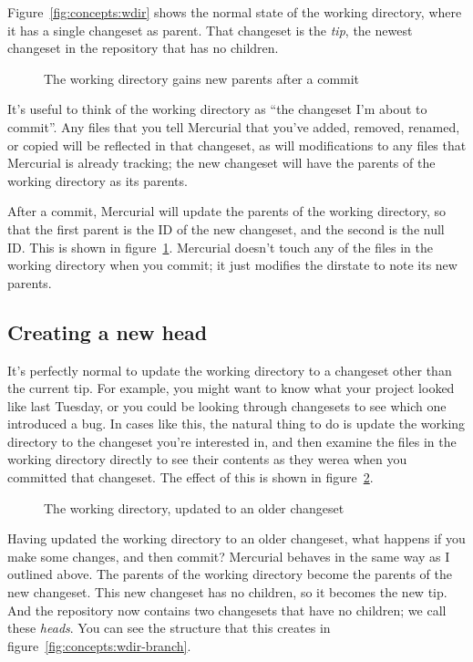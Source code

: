 Figure~\ref{fig:concepts:wdir} shows the normal state of the working
directory, where it has a single changeset as parent.  That changeset
is the \emph{tip}, the newest changeset in the repository that has no
children.

\begin{figure}[ht]
  \centering
  \caption{The working directory gains new parents after a commit}
  \label{fig:concepts:wdir-after-commit}
\end{figure}

It's useful to think of the working directory as ``the changeset I'm
about to commit''.  Any files that you tell Mercurial that you've
added, removed, renamed, or copied will be reflected in that
changeset, as will modifications to any files that Mercurial is
already tracking; the new changeset will have the parents of the
working directory as its parents.

After a commit, Mercurial will update the parents of the working
directory, so that the first parent is the ID of the new changeset,
and the second is the null ID.  This is shown in
figure~\ref{fig:concepts:wdir-after-commit}.  Mercurial doesn't touch
any of the files in the working directory when you commit; it just
modifies the dirstate to note its new parents.

\subsection{Creating a new head}

It's perfectly normal to update the working directory to a changeset
other than the current tip.  For example, you might want to know what
your project looked like last Tuesday, or you could be looking through
changesets to see which one introduced a bug.  In cases like this, the
natural thing to do is update the working directory to the changeset
you're interested in, and then examine the files in the working
directory directly to see their contents as they werea when you
committed that changeset.  The effect of this is shown in
figure~\ref{fig:concepts:wdir-pre-branch}.

\begin{figure}[ht]
  \centering
  \caption{The working directory, updated to an older changeset}
  \label{fig:concepts:wdir-pre-branch}
\end{figure}

Having updated the working directory to an older changeset, what
happens if you make some changes, and then commit?  Mercurial behaves
in the same way as I outlined above.  The parents of the working
directory become the parents of the new changeset.  This new changeset
has no children, so it becomes the new tip.  And the repository now
contains two changesets that have no children; we call these
\emph{heads}.  You can see the structure that this creates in
figure~\ref{fig:concepts:wdir-branch}.

